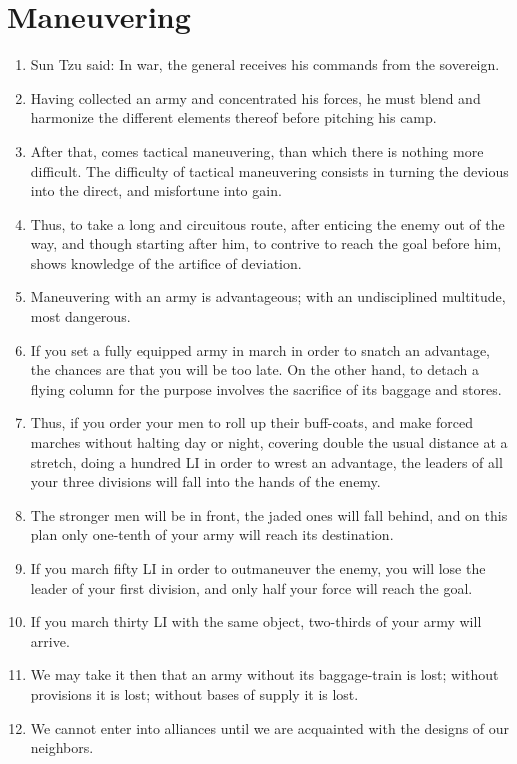 \documentclass[oneside]{book}
\begin{document}
\chapter{Maneuvering}
\begin{enumerate}
	\item Sun Tzu said: In war, the general receives his commands from the sovereign.
	\item Having collected an army and concentrated his forces, he must blend and harmonize the different elements thereof before pitching his camp.
	\item After that, comes tactical maneuvering, than which there is nothing more difficult. The difficulty of tactical maneuvering consists in turning the devious into the direct, and misfortune into gain.
	\item Thus, to take a long and circuitous route, after enticing the enemy out of the way, and though starting after him, to contrive to reach the goal before him, shows knowledge of the artifice of deviation.
	\item Maneuvering with an army is advantageous; with an undisciplined multitude, most dangerous.
	\item If you set a fully equipped army in march in order to snatch an advantage, the chances are that you will be too late. On the other hand, to detach a flying column for the purpose involves the sacrifice of its baggage and stores.
	\item Thus, if you order your men to roll up their buff-coats, and make forced marches without halting day or night, covering double the usual distance at a stretch, doing a hundred LI in order to wrest an advantage, the leaders of all your three divisions will fall into the hands of the enemy.
	\item The stronger men will be in front, the jaded ones will fall behind, and on this plan only one-tenth of your army will reach its destination.
	\item If you march fifty LI in order to outmaneuver the enemy, you will lose the leader of your first division, and only half your force will reach the goal.
	\item If you march thirty LI with the same object, two-thirds of your army will arrive.
	\item We may take it then that an army without its baggage-train is lost; without provisions it is lost; without bases of supply it is lost.
	\item We cannot enter into alliances until we are acquainted with the designs of our neighbors.

\end{enumerate}
\end{document}
